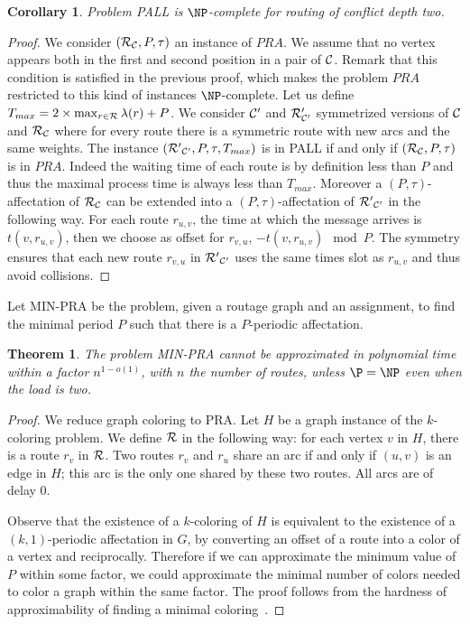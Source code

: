 \documentclass[a4paper,10pt]{article}
\newtheorem{theorem}{Theorem}
\newtheorem{corollary}{Corollary}
\begin{document}
\begin{corollary}
Problem PALL is $\NP$-complete for routing of conflict depth two.
\end{corollary}
\begin{proof}
 We consider $({\cal R}_{\cal C},P,\tau)$ an instance of $PRA$. We assume that no vertex appears both in the first and second position in a pair of ${\cal C}$. Remark that this condition is satisfied in the previous proof, which makes the problem $PRA$ restricted to this kind of instances $\NP$-complete. 
 Let us define $T_{max} = 2 \times \max_{r \in {\cal R}} \lambda(r) + P$. We consider ${\cal C}'$ and ${\cal R}'_{\cal C'}$ symmetrized versions of ${\cal C}$ and  ${\cal R}_{\cal C}$ where for every route there is a symmetric route with new arcs and the same weights.
 The instance $({\cal R'}_{\cal C'},P,\tau,T_{max})$ is in PALL if and only if $({\cal R}_{\cal C},P,\tau)	$
 is in $PRA$. Indeed the waiting time of each route is by definition less than $P$ and thus the maximal process time is always less than $T_{max}$. Moreover a $(P,\tau)$-affectation of ${\cal R}_{\cal C}$ can be extended into a $(P,\tau)$-affectation of ${\cal R'}_{\cal C'}$ in the following way. For each route $r_{u,v}$, the time at which the message arrives is $t(v,r_{u,v})$, then we choose as offset for $r_{v,u}$, $-t(v,r_{u,v}) \mod P$. The symmetry ensures that each new route $r_{v,u}$ in ${\cal R'}_{\cal C'}$ uses the same times slot as $r_{u,v}$ and thus avoid collisions.
\end{proof}

Let MIN-PRA be the problem, given a routage graph and an assignment, to find the minimal period $P$ such that there is a $P$-periodic affectation. 

\begin{theorem}
 The problem MIN-PRA cannot be approximated in polynomial time within a factor $n^{1-o(1)}$, with $n$ the number of routes, unless $\P = \NP$ even when the load is two.
\end{theorem}

\begin{proof}
 We reduce graph coloring to PRA. Let $H$ be a graph instance of the $k$-coloring problem. 
 We define ${\cal R}$ in the following way: for each vertex $v$ in $H$, there is a route $r_v$ in ${\cal R}$.
 Two routes $r_v$ and $r_u$ share an arc if and only if $(u,v)$ is an edge in $H$; this arc is the only one shared by these two routes.   
 All arcs are of delay $0$. 
 
 Observe that the existence of a $k$-coloring of $H$ is equivalent to the existence of a $(k,1)$-periodic affectation in $G$, 
 by converting an offset of a route into a color of a vertex and reciprocally. Therefore if we can approximate the minimum value of $P$ within some factor, we could approximate the minimal number of colors needed to color a graph within the same factor. The proof follows from the hardness of approximability of finding a minimal coloring~\cite{zuckerman2006linear}.
\end{proof}
\end{document}
